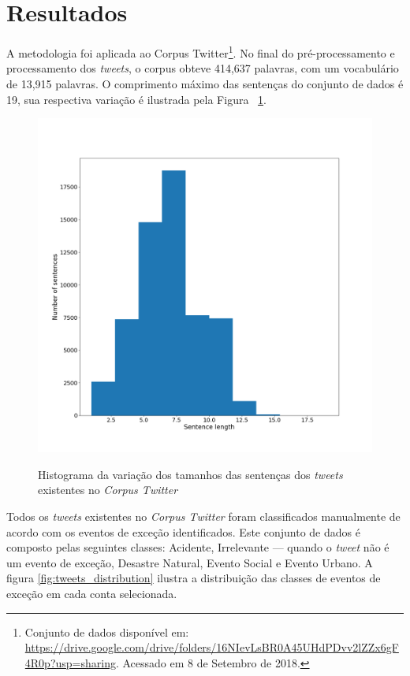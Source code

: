 \documentclass[
	12pt,				%
	oneside,			%
	a4paper,			%
	english,			%
	brazil				%
	]{abntex2ppgsi}
\begin{document}
\section{Resultados}
	
A metodologia foi aplicada ao Corpus Twitter\footnote{Conjunto de dados disponível em: \url{https://drive.google.com/drive/folders/16NIevLsBR0A45UHdPDvv2lZZx6gF4R0p?usp=sharing}. Acessado em 8 de Setembro de 2018.}. No final do pré-processamento e processamento dos \textit{tweets}, o corpus obteve 414,637 palavras, com um vocabulário de 13,915 palavras. O comprimento máximo das sentenças do conjunto de dados é 19, sua respectiva variação é ilustrada pela Figura ~\ref{fig:corpus_metrics}.
 
\begin{figure}[!htb]
	\centering
 	  \caption{Histograma da variação dos tamanhos das sentenças dos \textit{tweets} existentes no \textit{Corpus Twitter}}
		\includegraphics[width=1\linewidth]{images/corpus_metrics.png}
	\label{fig:corpus_metrics}
\end{figure}

Todos os \textit{tweets} existentes no \textit{Corpus Twitter} foram classificados manualmente de acordo com os eventos de exceção identificados. Este conjunto de dados é composto pelas seguintes classes: Acidente, Irrelevante --- quando o \textit{tweet} não é um evento de exceção, Desastre Natural, Evento Social e Evento Urbano. A figura \ref{fig:tweets_distribution} ilustra a distribuição das classes de eventos de exceção em cada conta selecionada.
\end{document}
